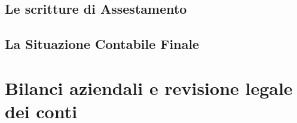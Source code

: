 \documentclass{report}
\begin{document}

\subsection{Le scritture di Assestamento} %
\label{sec:Le scritture di Assestamento}


\subsection{La Situazione Contabile Finale} %
\label{sec:La Situazione Contabile Finale}


\newpage
\section{Bilanci aziendali e revisione legale dei conti} %
\label{sec:Bilanci aziendali e revisione legale dei conti}
\end{document}
